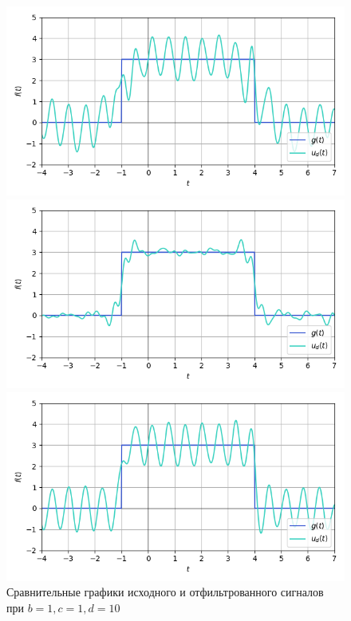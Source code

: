 \documentclass[a4paper]{article}
\begin{document}
\begin{figure}[H]
    \begin{minipage}{0.33\textwidth}
        \centering \includegraphics[width=\textwidth]{sources/band-stop filter/denoised (b=1, c=1, d=10, v=5).png}
        \caption{$v = 5$}
    \end{minipage}\hfill
    \begin{minipage}{0.33\textwidth}
        \centering \includegraphics[width=\textwidth]{sources/band-stop filter/denoised (b=1, c=1, d=10, v=9).png}
        \caption{$v = 9$}
    \end{minipage}\hfill
    \begin{minipage}{0.33\textwidth}
        \centering \includegraphics[width=\textwidth]{sources/band-stop filter/denoised (b=1, c=1, d=10, v=16).png}
        \caption{$v = 16$}
    \end{minipage}
    \caption*{Сравнительные графики исходного и отфильтрованного сигналов при $b=1, c=1, d=10$}
\end{figure}
\end{document}
